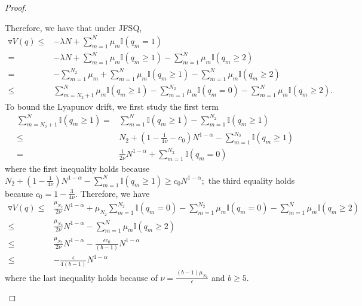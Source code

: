 \documentclass[11pt,oneside,letter]{article}
\begin{document}
\begin{proof}
\begin{itemize}
Therefore, we have that under JFSQ, 
\begin{align*}
\triangledown V(q)\leq&-\lambda N + \sum_{m=1}^{N} \mu_m\mathbb{I}(q_m=1)\\
=&-\lambda N + \sum_{m=1}^{ N} \mu_m\mathbb{I}(q_m\geq 1)-\sum_{m=1}^{N} \mu_m\mathbb{I}(q_m\geq 2)\\
=&-\sum_{m=1}^{N_2} \mu_m + \sum_{m=1}^{ N} \mu_m\mathbb{I}(q_m\geq 1)-\sum_{m=1}^{N} \mu_m\mathbb{I}(q_m\geq 2)\\
\leq &\sum_{m=N_2+1}^{ N} \mu_m\mathbb{I}(q_m\geq 1)-\sum_{m=1}^{N_2} \mu_m \mathbb{I}(q_m = 0) - \sum_{m=1}^{N} \mu_m\mathbb{I}(q_m\geq 2).
\end{align*}
To bound the Lyapunov drift, we first study the first term  
\begin{align*}
\sum_{m=N_2+1}^{ N} \mathbb{I}(q_m\geq 1)
= &\sum_{m=1}^{ N} \mathbb{I}(q_m\geq 1)-\sum_{m=1}^{N_2} \mathbb{I}(q_m\geq 1)\\
\leq &N_2 + (1-\frac{1}{4\nu}- c_0) N^{{1-\alpha}}-\sum_{m=1}^{N_2} \mathbb{I}(q_m\geq 1)\\
= & \frac{1}{2\nu}  N^{{1-\alpha}} + \sum_{m=1}^{N_2} \mathbb{I}(q_m = 0)
\end{align*} where the first inequality holds because $N_2+(1-\frac{1}{4\nu})N^{1-\alpha}- \sum_{m=1}^{ N} \mathbb{I}(q_m\geq 1)\geq  c_0  N^{1-\alpha};$ the third equality holds because $c_0=1-\frac{3}{4\nu}.$  
Therefore, we have 
\begin{align*}
\triangledown V(q)
\leq&  \frac{\mu_{N_2}}{2\nu} N^{{1-\alpha}} + \mu_{N_2} \sum_{m=1}^{N_2} \mathbb{I}(q_m = 0) -\sum_{m=1}^{N_2} \mu_m \mathbb{I}(q_m = 0) -\sum_{m=1}^{N} \mu_m\mathbb{I}(q_m\geq 2)\\
\leq& \frac{\mu_{N_2}}{2\nu} N^{1-\alpha}  - \sum_{m=1}^{N} \mu_m\mathbb{I}(q_m\geq 2) \\
\leq& \frac{\mu_{N_2}}{2\nu} N^{1-\alpha}  - \frac{\epsilon c_0 }{(b-1)} N^{1-\alpha} \\
\leq & - \frac{\epsilon}{4(b-1)} N^{1-\alpha}
\end{align*} 
where the last inequality holds because of $\nu = \frac{(b-1)\mu_{N_2}}{\epsilon}$ and $b\geq 5.$  
\end{itemize}


\end{proof}
\end{document}

